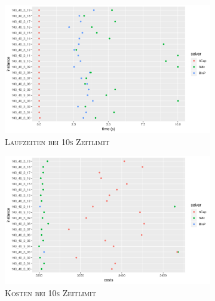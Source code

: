 \begin{figure}[H]
\centering
\begin{subfigure}[b]{0.4\textwidth}
\centering
\includegraphics[width=1.3\textwidth]{img/solver_instance_time_b=3_s_10s.png}
\caption{\textsc{Laufzeiten bei 10s Zeitlimit}}
\label{fig:b=3_s_runtimes}
\end{subfigure}
\hfill
\begin{subfigure}[b]{0.4\textwidth}
\centering
\includegraphics[width=1.3\textwidth]{img/solver_instance_cost_b=3_s_10s.png}
\caption{\textsc{Kosten bei 10s Zeitlimit}}
\label{fig:b=3_s_costs}
\end{subfigure}
\caption{}
\end{figure}

